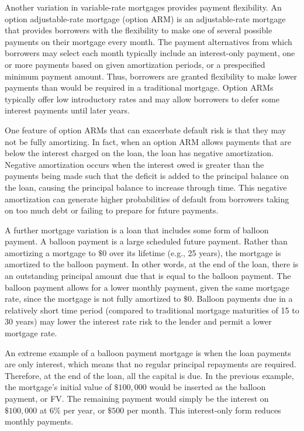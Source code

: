 \documentclass[11pt]{article}
\begin{document}
Another variation in variable-rate mortgages provides payment flexibility. An option adjustable-rate mortgage (option ARM) is an adjustable-rate mortgage that provides borrowers with the flexibility to make one of several possible payments on their mortgage every month. The payment alternatives from which borrowers may select each month typically include an interest-only payment, one or more payments based on given amortization periods, or a prespecified minimum payment amount. Thus, borrowers are granted flexibility to make lower payments than would be required in a traditional mortgage. Option ARMs typically offer low introductory rates and may allow borrowers to defer some interest payments until later years.

One feature of option ARMs that can exacerbate default risk is that they may not be fully amortizing. In fact, when an option ARM allows payments that are below the interest charged on the loan, the loan has negative amortization. Negative amortization occurs when the interest owed is greater than the payments being made such that the deficit is added to the principal balance on the loan, causing the principal balance to increase through time. This negative amortization can generate higher probabilities of default from borrowers taking on too much debt or failing to prepare for future payments.

A further mortgage variation is a loan that includes some form of balloon payment. A balloon payment is a large scheduled future payment. Rather than amortizing a mortgage to $\$ 0$ over its lifetime (e.g., 25 years), the mortgage is amortized to the balloon payment. In other words, at the end of the loan, there is an outstanding principal amount due that is equal to the balloon payment. The balloon payment allows for a lower monthly payment, given the same mortgage rate, since the mortgage is not fully amortized to $\$ 0$. Balloon payments due in a relatively short time period (compared to traditional mortgage maturities of 15 to 30 years) may lower the interest rate risk to the lender and permit a lower mortgage rate.

An extreme example of a balloon payment mortgage is when the loan payments are only interest, which means that no regular principal repayments are required. Therefore, at the end of the loan, all the capital is due. In the previous example, the mortgage's initial value of $\$ 100,000$ would be inserted as the balloon payment, or FV. The remaining payment would simply be the interest on $\$ 100,000$ at $6 \%$ per year, or $\$ 500$ per month. This interest-only form reduces monthly payments.
\end{document}
